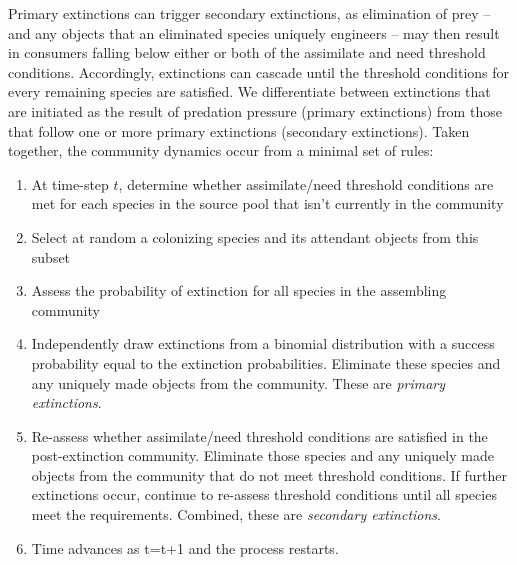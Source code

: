 \documentclass[twocolumn,preprintnumbers,amsmath,amssymb,superscriptaddress]{revtex4}
\begin{document}
Primary extinctions can trigger secondary extinctions, as elimination of prey -- and any objects that an eliminated species uniquely engineers -- may then result in consumers falling below either or both of the assimilate and need threshold conditions.
Accordingly, extinctions can cascade until the threshold conditions for every remaining species are satisfied.
We differentiate between extinctions that are initiated as the result of predation pressure (primary extinctions) from those that follow one or more primary extinctions (secondary extinctions).
Taken together, the community dynamics occur from a minimal set of rules:
\begin{enumerate}
  \item At time-step $t$, determine whether assimilate/need threshold conditions are met for each species in the source pool that isn't currently in the community
  \item Select at random a colonizing species and its attendant objects from this subset
  \item Assess the probability of extinction for all species in the assembling community
  \item Independently draw extinctions from a binomial distribution with a success probability equal to the extinction probabilities. Eliminate these species and any uniquely made objects from the community. These are \emph{primary extinctions}.
  \item Re-assess whether assimilate/need threshold conditions are satisfied in the post-extinction community. Eliminate those species and any uniquely made objects from the community that do not meet threshold conditions. If further extinctions occur, continue to re-assess threshold conditions until all species meet the requirements. Combined, these are \emph{secondary extinctions}.
  \item Time advances as t=t+1 and the process restarts.
\end{enumerate}
















% 
\end{document}
